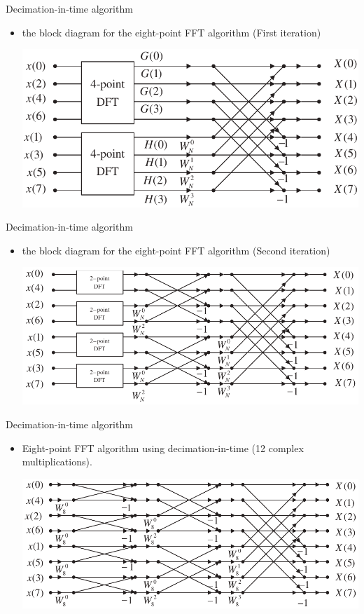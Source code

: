 \documentclass[pdflatex,compress,mathserif]{beamer}
\begin{document}
\begin{frame}{Decimation-in-time algorithm}
	\begin{itemize}
		\item the block diagram for the eight-point FFT algorithm (First iteration)
		\begin{center}
			\includegraphics[width=\linewidth]{img/img28}
		\end{center}
	\end{itemize}
\end{frame}

\begin{frame}{Decimation-in-time algorithm}
	\begin{itemize}
		\item the block diagram for the eight-point FFT algorithm (Second iteration)
		\begin{center}
			\includegraphics[width=\linewidth]{img/img29}
		\end{center}
	\end{itemize}
\end{frame}

\begin{frame}{Decimation-in-time algorithm}
	\begin{itemize}
		\item Eight-point FFT algorithm using decimation-in-time (12 complex multiplications).
		\begin{center}
			\includegraphics[width=\linewidth]{img/img30}
		\end{center}
	\end{itemize}
\end{frame}
\end{document}

